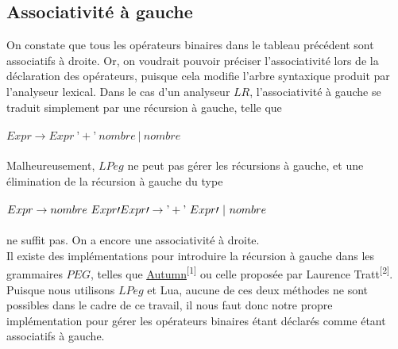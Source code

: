 \documentclass{article}
\begin{document}
\subsection{Associativité à gauche}
On constate que tous les opérateurs binaires dans le tableau précédent sont associatifs à droite. Or, on voudrait pouvoir préciser l'associativité lors de la déclaration des opérateurs, puisque cela modifie l'arbre syntaxique produit par l'analyseur lexical. Dans le cas d'un analyseur $LR$, l'associativité à gauche se traduit simplement par une récursion à gauche, telle que
\ \\ \\
\begin{math}
Expr \rightarrow Expr \ \textrm{'}+\textrm{'} \ nombre \ | \ nombre
\end{math} \\ \\
Malheureusement, $LPeg$ ne peut pas gérer les récursions à gauche, et une élimination de la récursion à gauche du type
\\ \\
\noindent\begin{math}
	Expr \rightarrow nombre \ Expr\prime \\
	Expr\prime \rightarrow \textrm{'} + \textrm{'} \ Expr\prime \ | \ nombre
\end{math} \\ \\
ne suffit pas. On a encore une associativité à droite. \\
Il existe des implémentations pour introduire la récursion à gauche dans les grammaires $PEG$, telles que \underline{\href{https://github.com/norswap/whimsy/blob/master/doc/autumn/README.md}{Autumn}}\textsuperscript{[1]} ou celle proposée par Laurence Tratt\textsuperscript{[2]}. Puisque nous utilisons $LPeg$ et Lua, aucune de ces deux méthodes ne sont possibles dans le cadre de ce travail, il nous faut donc notre propre implémentation pour gérer les opérateurs binaires étant déclarés comme étant associatifs à gauche.
\end{document}
